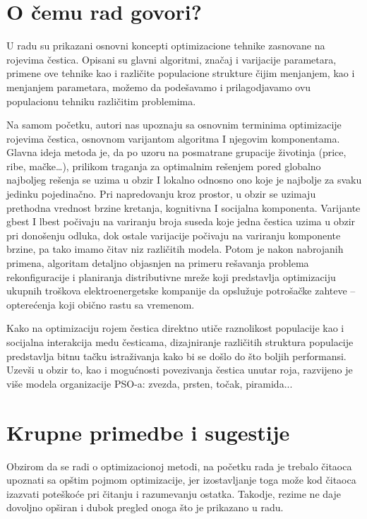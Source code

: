 \documentclass[a4paper]{report}
\begin{document}
\section{O čemu rad govori?}
{
U radu su prikazani osnovni koncepti optimizacione tehnike zasnovane na rojevima čestica. Opisani su glavni algoritmi, značaj i varijacije parametara, primene ove tehnike kao i različite populacione strukture čijim menjanjem, kao i menjanjem parametara, možemo da podešavamo i prilagodjavamo ovu populacionu tehniku različitim problemima.

Na samom početku, autori nas upoznaju sa osnovnim terminima optimizacije rojevima čestica, osnovnom varijantom algoritma I njegovim komponentama. Glavna ideja metoda je, da po uzoru na posmatrane grupacije životinja (price, ribe, mačke…), prilikom traganja za optimalnim rešenjem pored globalno najboljeg rešenja se uzima u obzir I lokalno odnosno ono koje je najbolje za svaku jedinku pojedinačno. Pri napredovanju kroz prostor, u obzir se uzimaju prethodna vrednost brzine kretanja, kognitivna I socijalna komponenta. Varijante gbest I lbest počivaju na variranju broja suseda koje jedna čestica uzima u obzir pri donošenju odluka, dok ostale varijacije počivaju na variranju komponente brzine, pa tako imamo čitav niz različitih modela.  Potom je nakon nabrojanih primena, algoritam detaljno objasnjen na primeru rešavanja problema rekonfiguracije i planiranja distributivne mreže  koji predstavlja optimizaciju ukupnih troškova elektroenergetske kompanije da opslužuje potrošačke zahteve – opterećenja koji obično rastu sa vremenom.

Kako na optimizaciju rojem čestica direktno utiče raznolikost populacije kao i socijalna interakcija medu česticama, dizajniranje različitih struktura populacije
predstavlja bitnu tačku istraživanja kako bi se došlo do što boljih performansi. Uzevši u obzir to, kao i mogućnosti povezivanja čestica unutar roja, razvijeno je više modela organizacije PSO-a: zvezda, prsten, točak, piramida... 
}

\section{Krupne primedbe i sugestije}
{ Obzirom da se radi o optimizacionoj metodi, na početku rada je trebalo čitaoca upoznati sa opštim pojmom optimizacije, jer izostavljanje toga može kod čitaoca izazvati poteškoće pri čitanju i razumevanju ostatka.}
{Takodje, rezime ne daje dovoljno opširan i dubok pregled onoga što je prikazano u radu. }
\end{document}
